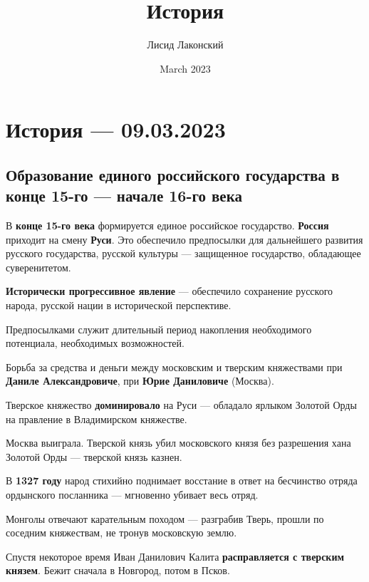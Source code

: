 \documentclass{article}
\title{История}
\author{Лисид Лаконский}
\date{March 2023}
\begin{document}
\raggedright

\maketitle
\tableofcontents
\pagebreak

\section{История — 09.03.2023}

\subsection{Образование единого российского государства в конце 15-го — начале 16-го века}

В \textbf{конце 15-го века} формируется единое российское государство. \textbf{Россия} приходит на смену \textbf{Руси}. Это обеспечило предпосылки для дальнейшего развития русского государства, русской культуры — защищенное государство, обладающее суверенитетом.

\textbf{Исторически прогрессивное явление} — обеспечило сохранение русского народа, русской нации в исторической перспективе.

\hfill

Предпосылками служит длительный период накопления необходимого потенциала, необходимых возможностей.

\hfill

Борьба за средства и деньги между московским и тверским княжествами при \textbf{Даниле Александровиче}, при \textbf{Юрие Даниловиче} (Москва).

Тверское княжество \textbf{доминировало} на Руси — обладало ярлыком Золотой Орды на правление в Владимирском княжестве.

Москва выиграла. Тверской князь убил московского князя без разрешения хана Золотой Орды — тверской князь казнен.

\hfill

В \textbf{1327 году} народ стихийно поднимает восстание в ответ на бесчинство отряда ордынского посланника — мгновенно убивает весь отряд.

Монголы отвечают карательным походом — разграбив Тверь, прошли по соседним княжествам, не тронув московскую землю.

Спустя некоторое время Иван Данилович Калита \textbf{расправляется с тверским князем}. Бежит сначала в Новгород, потом в Псков.

\hfill
\end{document}

